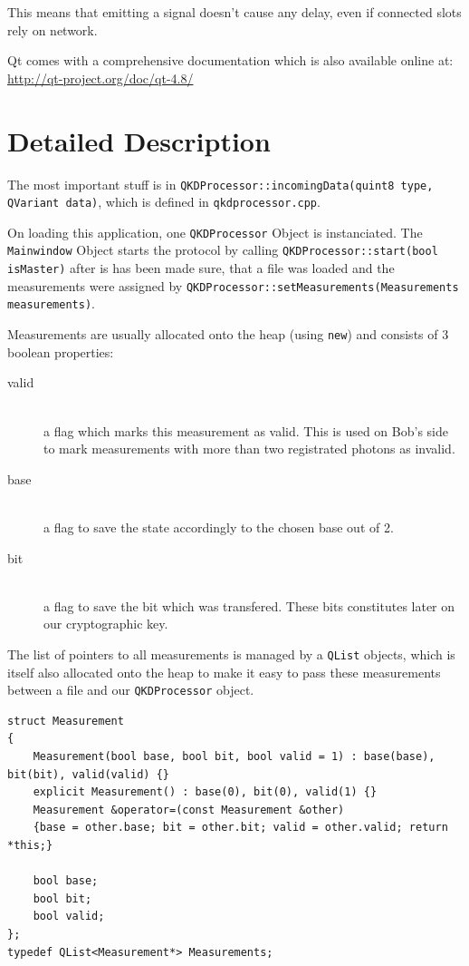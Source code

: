 \documentclass[a4paper,pdftex,DIV18,parskip=half+]{scrartcl}
\begin{document}
This means that emitting a signal doesn't cause any delay, even if connected slots
rely on network.

Qt comes with a comprehensive documentation which is also available online at: \\
\url{http://qt-project.org/doc/qt-4.8/}


\section*{Detailed Description}



The most important stuff is in \texttt{QKDProcessor::incomingData(quint8
type, QVariant data)}, which is defined in \texttt{qkdprocessor.cpp}.

On loading this application, one \texttt{QKDProcessor} Object is instanciated.
The \texttt{Mainwindow} Object starts the protocol by calling
\texttt{QKDProcessor::start(bool isMaster)} after is has been made sure,
that a file was loaded and the measurements were assigned by
\texttt{QKDProcessor::setMeasurements(Measurements \*measurements)}.

Measurements are usually allocated onto the heap (using \texttt{new}) and
consists of 3 boolean properties:
\begin{description}
  \item[valid] \hfill \\ a flag which marks this measurement as valid. This is used on
               Bob's side to mark measurements with more than two registrated
               photons as invalid.
  \item[base]  \hfill \\ a flag to save the state accordingly to the chosen base out of 2.
  \item[bit]   \hfill \\ a flag to save the bit which was transfered. These bits constitutes
               later on our cryptographic key.
\end{description}

The list of pointers to all measurements is managed by a \texttt{QList} objects,
which is itself also allocated onto the heap to make it easy to pass these
measurements between a file and our \texttt{QKDProcessor} object.

\begin{lstlisting}[caption={extract of measurement.h}]
struct Measurement
{
    Measurement(bool base, bool bit, bool valid = 1) : base(base), bit(bit), valid(valid) {}
    explicit Measurement() : base(0), bit(0), valid(1) {}
    Measurement &operator=(const Measurement &other)
    {base = other.base; bit = other.bit; valid = other.valid; return *this;}

    bool base;
    bool bit;
    bool valid;
};
typedef QList<Measurement*> Measurements;
\end{lstlisting}
\end{document}
